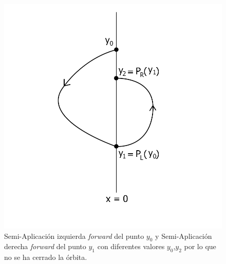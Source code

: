 \documentclass[12pt,a4paper]{report} %
\begin{document}
	 \begin{figure}[h]
		\centering
		\includegraphics[width=1\textwidth]{aplipoincareLR.jpg}
		\caption{Semi-Aplicación izquierda \textit{forward} del punto $y_0$ y Semi-Aplicación derecha \textit{forward} del punto $y_1$ con diferentes valores $y_0$,$y_2$ por lo que no se ha cerrado la órbita.}
		\label{fig:aplipoincareLR}
	\end{figure}\smallskip
	
	\newpage
	
\end{document}
